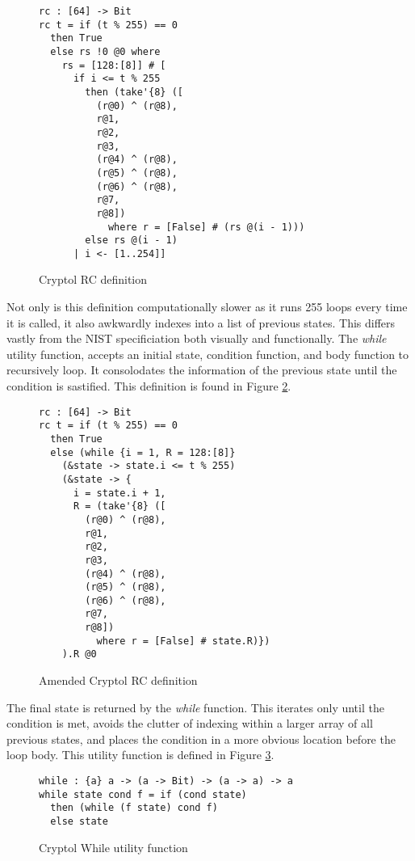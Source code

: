 \begin{figure}[h]
  \centering
\begin{lstlisting}[language=Cryptol]
rc : [64] -> Bit
rc t = if (t % 255) == 0 
  then True 
  else rs !0 @0 where
    rs = [128:[8]] # [
      if i <= t % 255
        then (take'{8} ([
          (r@0) ^ (r@8),
          r@1,
          r@2,
          r@3, 
          (r@4) ^ (r@8),
          (r@5) ^ (r@8),
          (r@6) ^ (r@8),
          r@7,
          r@8])
            where r = [False] # (rs @(i - 1)))
        else rs @(i - 1)
      | i <- [1..254]]
\end{lstlisting}
\caption{Cryptol RC definition}
\label{fig:cryptolRC}
\end{figure}

Not only is this definition computationally slower as it runs 255 loops every time it is called, it also awkwardly indexes into a list of previous states. 
This differs vastly from the NIST specificiation both visually and functionally. 
The \emph{while} utility function, accepts an initial state, condition function, and body function to recursively loop. 
It consolodates the information of the previous state until the condition is sastified. 
This definition is found in Figure \ref{fig:cryptolamendedRC}.

\begin{figure}[h]
  \centering
\begin{lstlisting}[language=Cryptol]
rc : [64] -> Bit
rc t = if (t % 255) == 0 
  then True 
  else (while {i = 1, R = 128:[8]}
    (&state -> state.i <= t % 255)
    (&state -> {
      i = state.i + 1, 
      R = (take'{8} ([
        (r@0) ^ (r@8),
        r@1,
        r@2,
        r@3,
        (r@4) ^ (r@8),
        (r@5) ^ (r@8),
        (r@6) ^ (r@8),
        r@7, 
        r@8]) 
          where r = [False] # state.R)})
    ).R @0
\end{lstlisting}
\caption{Amended Cryptol RC definition}
\label{fig:cryptolamendedRC}
\end{figure}

The final state is returned by the \emph{while} function. 
This iterates only until the condition is met, avoids the clutter of indexing within a larger array of all previous states, and places the condition in a more obvious location before the loop body. 
This utility function is defined in Figure \ref{fig:cryptolWhile}.

\begin{figure}[h]
  \centering
\begin{lstlisting}[language=Cryptol]
while : {a} a -> (a -> Bit) -> (a -> a) -> a
while state cond f = if (cond state)
  then (while (f state) cond f)	
  else state
\end{lstlisting}
\caption{Cryptol While utility function}
\label{fig:cryptolWhile}
\end{figure}
